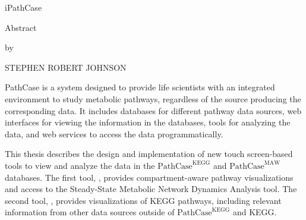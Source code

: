 \newcommand{\pathcasekegg}{ $\mathrm{PathCase}^\mathrm{KEGG}$ }
\newcommand{\pathcasemaw}{ $\mathrm{PathCase}^\mathrm{MAW}$ }

\begin{center}
    iPathCase

    Abstract

    by

    STEPHEN ROBERT JOHNSON
\end{center}

PathCase is a system designed to provide life scientists with an integrated
environment to study metabolic pathways, regardless of the source producing the
corresponding data. It includes databases for different pathway data sources,
web interfaces for viewing the information in the databases, tools for analyzing
the data, and web services to access the data programmatically.

This thesis describes the design and implementation of new touch screen-based
tools to view and analyze the data in the \pathcasekegg and \pathcasemaw
databases. The first tool, \mawapp, provides compartment-aware pathway
visualizations and access to the Steady-State Metabolic Network Dynamics
Analysis tool. The second tool, \keggapp, provides visualizations of KEGG
pathways, including relevant information from other data sources outside of
\pathcasekegg and KEGG.
